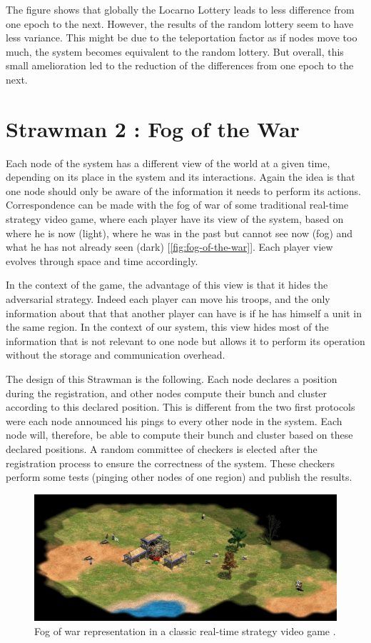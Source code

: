 \documentclass[a4paper,11pt,twoside=semi,openright]{report}
\begin{document}
The figure shows that globally the Locarno Lottery leads to less difference
from one epoch to the next. However, the results of the random lottery seem to
have less variance. This might be due to the teleportation factor as if nodes
move too much, the system becomes equivalent to the random lottery. But
overall, this small amelioration led to the reduction of the differences from
one epoch to the next.

\section{Strawman 2 : Fog of the War} \label{sec:Fog-of-the-war}

Each node of the system has a different view of the world at a given time,
depending on its place in the system and its interactions. Again the idea is
that one node should only be aware of the information it needs to perform its
actions. Correspondence can be made with the fog of war of some traditional
real-time strategy video game, where each player have its view of the system,
based on where he is now (light), where he was in the past but cannot see now
(fog) and what he has not already seen (dark) [\autoref{fig:fog-of-the-war}].
Each player view evolves through space and time accordingly.

In the context of the game, the advantage of this view is that it hides the
adversarial strategy. Indeed each player can move his troops, and the only
information about that that another player can have is if he has himself a unit
in the same region. In the context of our system, this view
hides most of the information that is not relevant to one node but allows it
to perform its operation without the storage and communication overhead. 

The design of this Strawman is the following. Each node declares a position
during the registration, and other nodes compute their bunch and cluster
according to this declared position. This is different from the two first
protocols were each node announced his pings to every other node in the system.
Each node will, therefore, be able to compute their bunch and cluster based on
these declared positions. A random committee of checkers is elected after the
registration process to ensure the correctness of the system. These checkers
perform some tests (pinging other nodes of one region) and publish the results. 

\begin{figure}[!h] 
\centering
\includegraphics[width=400pt]{figures/fog_of_war}
\caption{Fog of war representation in a classic real-time strategy video game \cite{ageofempire1999}. }
\label{fig:fog-of-the-war}
\end{figure}
\end{document}

